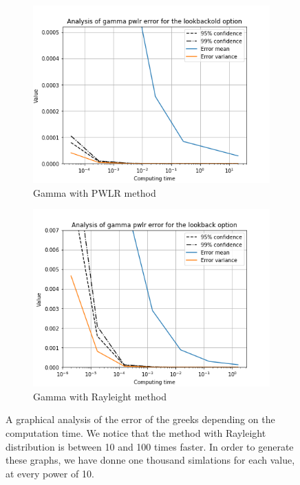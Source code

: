 \documentclass[11pt,a4paper,fleqn]{article}
\begin{document}
\begin{figure}[h!]
       \begin{subfigure}[b]{0.45\textwidth}
           \includegraphics[width=\textwidth]{graphs/lookbackoldgammapwlrtime.png}
           \caption{Gamma with PWLR method}
       \end{subfigure}
       \begin{subfigure}[b]{0.45\textwidth}
           \includegraphics[width=\textwidth]{graphs/lookbackgammapwlrtime.png}
          \caption{Gamma with Rayleight method}
      \end{subfigure}

        \caption{\label{fig:lboptiongraphs}A graphical analysis of the error of the greeks depending on the computation time. We notice that the method with Rayleight distribution is between 10 and 100 times faster. In order to generate these graphs, we have donne one thousand simlations for each value, at every power of 10.}
 \end{figure}
 \FloatBarrier
\end{document}
